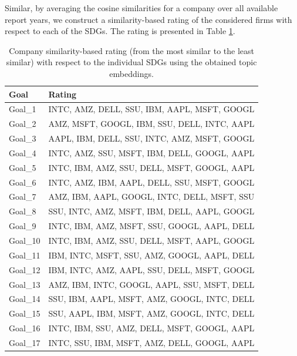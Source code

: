 \documentclass[
]{article}
\begin{document}
Similar, by averaging the cosine similarities for a company over all available report years, we construct a similarity-based rating of the considered firms with respect to each of the SDGs. The rating is presented in Table \ref{tab:tab02}.

\begin{table}

\caption{\label{tab:tab02}Company similarity-based rating (from the most similar to the least similar) with respect to the individual SDGs using the obtained topic embeddings.}
\centering
\begin{tabular}[t]{l|l}
\hline
Goal & Rating\\
\hline
Goal\_1 & INTC, AMZ, DELL, SSU, IBM, AAPL, MSFT, GOOGL\\
\hline
Goal\_2 & AMZ, MSFT, GOOGL, IBM, SSU, DELL, INTC, AAPL\\
\hline
Goal\_3 & AAPL, IBM, DELL, SSU, INTC, AMZ, MSFT, GOOGL\\
\hline
Goal\_4 & INTC, AMZ, SSU, MSFT, IBM, DELL, GOOGL, AAPL\\
\hline
Goal\_5 & INTC, IBM, AMZ, SSU, DELL, MSFT, GOOGL, AAPL\\
\hline
Goal\_6 & INTC, AMZ, IBM, AAPL, DELL, SSU, MSFT, GOOGL\\
\hline
Goal\_7 & AMZ, IBM, AAPL, GOOGL, INTC, DELL, MSFT, SSU\\
\hline
Goal\_8 & SSU, INTC, AMZ, MSFT, IBM, DELL, AAPL, GOOGL\\
\hline
Goal\_9 & INTC, IBM, AMZ, MSFT, SSU, GOOGL, AAPL, DELL\\
\hline
Goal\_10 & INTC, IBM, AMZ, SSU, DELL, MSFT, AAPL, GOOGL\\
\hline
Goal\_11 & IBM, INTC, MSFT, SSU, AMZ, GOOGL, AAPL, DELL\\
\hline
Goal\_12 & IBM, INTC, AMZ, AAPL, SSU, DELL, MSFT, GOOGL\\
\hline
Goal\_13 & AMZ, IBM, INTC, GOOGL, AAPL, SSU, MSFT, DELL\\
\hline
Goal\_14 & SSU, IBM, AAPL, MSFT, AMZ, GOOGL, INTC, DELL\\
\hline
Goal\_15 & SSU, AAPL, IBM, MSFT, AMZ, GOOGL, INTC, DELL\\
\hline
Goal\_16 & INTC, IBM, SSU, AMZ, DELL, MSFT, GOOGL, AAPL\\
\hline
Goal\_17 & INTC, SSU, IBM, MSFT, AMZ, DELL, GOOGL, AAPL\\
\hline
\end{tabular}
\end{table}
\end{document}
